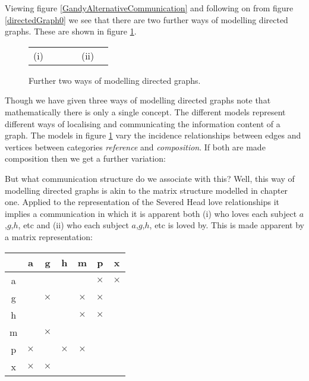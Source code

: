 \noindent Viewing figure \ref{GandyAlternativeCommunication} and following on from figure \ref{directedGraph0} we see that there are two 
further ways of modelling directed graphs. These are shown in figure \ref{directedGraphs1and2}.
\begin{figure}[H]
\begin{erbox}
\vspace{0.3cm}
\caption{Further two ways of modelling directed graphs.}
\label{directedGraphs1and2}
\begin{center}
\small
\begin{tabular}{c c p{1cm} | p{1cm} c c}
(i)  & \raisebox{-1.5cm}{
} & & &
(ii) &  \raisebox{-1.5cm}{
} \\
\end{tabular}
\normalsize
\end{center}
\end{erbox}
\end{figure}
 
\noindent Though we have given three ways of modelling directed graphs note that mathematically there is only a single concept.  The different models represent different ways of localising and communicating the information content of a graph. 
The models in figure \ref{directedGraphs1and2} vary the incidence relationships between edges and vertices between categories \textit{reference} and \textit{composition}. If both are made composition then we get a further variation:
 

\noindent But what communication structure do we associate with this?  Well, this way of modelling directed graphs is akin to the matrix structure modelled in chapter one. Applied to the representation of the Severed Head love relationships it implies a communication in which it is apparent both (i) who loves each subject $a$,$g$,$h$, etc  and (ii) who each subject $a$,$g$,$h$, etc  is loved by. This is made apparent by a matrix representation:
\begin{center}
\begin{tabular}{c | c c c c c c}
 &a&g&h&m&p&x\\
\hline
a&&&&&$\times$&$\times$\\
g&&$\times$&&$\times$&$\times$&\\
h&&&&$\times$&$\times$&\\
m&&$\times$&&&&\\
p&$\times$&&$\times$&$\times$&&\\
x&$\times$&$\times$&&&&\\
\end{tabular}
\end{center}



